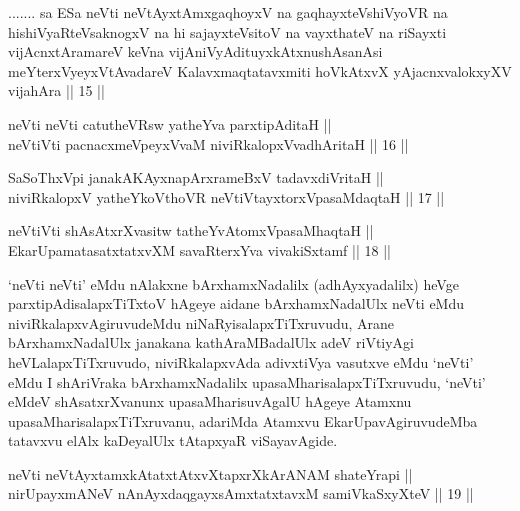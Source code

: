 \begin{kandikeshl}
....... sa ESa neVti neVtAyxtAmxgaqhoyxV na gaqhayxteV\s shiVyoVR na hi\break shiVyaRteV\s saknogxV na hi sajayxteV\s sitoV na vayxthateV na riSayxti vijAcnxtAramareV keVna vijAniVyAdituyxkAtxnushAsanAsi meYterxVyeyxVtAvadareV Kalavxmaqtatavxmiti hoVkAtxvX yAjacnxvalokxyXV vijahAra || 15 ||
\end{kandikeshl}

\begin{shl}
neVti neVti catutheVR\s sw yatheYva parxtipAditaH || \\
neVtiVti pacnacxmeV\s peyxVvaM niviRkalopxV\s vadhAritaH \hfill || 16 ||  
\end{shl}
				
\begin{shl}
SaSoThxV\s pi janakAKAyxnapArxrameBxV tadavxdiVritaH || \\
niviRkalopxV yatheYkoV\s thoVR  neVtiVtayxtorxVpasaMdaqtaH \hfill || 17 ||  
\end{shl}

\begin{shl}
neVtiVti shAsAtxrXvasitw tatheYvA\s \s tomxVpasaMhaqtaH || \\
EkarUpamatasatxtatxvXM savaRterxYva vivakiSxtamf \hfill || 18 ||  
\end{shl}

\begin{artha}
`neVti neVti' eMdu nAlakxne bArxhamxNadalilx (adhAyxyadalilx) heVge parxtipAdisalapxTiTxtoV hAgeye aidane bArxhamxNadalUlx neVti eMdu niviRkalapxvAgiruvudeMdu niNaRyisalapxTiTxruvudu, Arane bArxhamxNadalUlx janakana kathAraMBadalUlx adeV riVtiyAgi heVLalapxTiTxruvudo, niviRkalapxvAda adivxtiVya vasutxve eMdu `neVti' eMdu I shAriVraka bArxhamxNadalilx upasaMharisalapxTiTxruvudu, `neVti' eMdeV shAsatxrXvanunx upasaMharisuvAgalU hAgeye Atamxnu upasaMharisalapxTiTxruvanu, adariMda Atamxvu EkarUpavAgiruvudeMba tatavxvu elAlx kaDeyalUlx tAtapxyaR viSayavAgide.
\end{artha}

\begin{shl}
neVti neVtAyxtamxkAtatxtAtxvXtapxrXkArANAM shateYrapi || \\
nirUpayxmANeV nAnAyxdaqgayxsAmxtatxtavxM samiVkaSxyXteV \hfill || 19 ||  
\end{shl}
				
